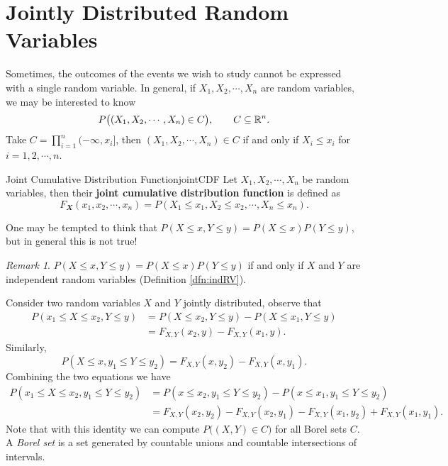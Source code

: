 \documentclass[math]{amznotes}
\theoremstyle{remark}
\newtheorem*{remark}{Remark}
\begin{document}
\section{Jointly Distributed Random Variables}
Sometimes, the outcomes of the events we wish to study cannot be expressed with a single random variable. In general, if $X_1, X_2, \cdots, X_n$ are random variables, we may be interested to know
\begin{equation*}
    P\bigl((X_1, X_2, \cdots, X_n) \in C\bigr), \qquad C \subseteq \mathbb{R}^n.
\end{equation*}
Take $C = \prod_{i = 1}^{n}(-\infty, x_i]$, then $(X_1, X_2, \cdots, X_n) \in C$ if and only if $X_i \leq x_i$ for $i = 1, 2, \cdots, n$. 
\begin{dfnbox}{Joint Cumulative Distribution Function}{jointCDF}
    Let $X_1, X_2, \cdots, X_n$ be random variables, then their {\color{red} \textbf{joint cumulative distribution function}} is defined as
    \begin{equation*}
        F_{\mathbfit{X}}(x_1, x_2, \cdots, x_n) = P(X_1 \leq x_1, X_2 \leq x_2, \cdots, X_n \leq x_n).
    \end{equation*}
\end{dfnbox}
One may be tempted to think that $P(X \leq x, Y \leq y) = P(X \leq x)P(Y \leq y)$, but in general this is not true!
\begin{notebox}
    \begin{remark}
        $P(X \leq x, Y \leq y) = P(X \leq x)P(Y \leq y)$ if and only if $X$ and $Y$ are independent random variables (Definition \ref{dfn:indRV}).
    \end{remark}
\end{notebox}
Consider two random variables $X$ and $Y$ jointly distributed, observe that
\begin{align*}
    P(x_1 \leq X \leq x_2, Y \leq y) & = P(X \leq x_2, Y \leq y) - P(X \leq x_1, Y \leq y) \\
    & = F_{X, Y}(x_2, y) - F_{X, Y}(x_1, y).
\end{align*}
Similarly,
\begin{equation*}
    P(X \leq x, y_1 \leq Y \leq y_2) = F_{X, Y}(x, y_2) - F_{X, Y}(x, y_1).
\end{equation*}
Combining the two equations we have
\begin{align*}
    P(x_1 \leq X \leq x_2, y_1 \leq Y \leq y_2) & = P(x \leq x_2, y_1 \leq Y \leq y_2) - P(x \leq x_1, y_1 \leq Y \leq y_2) \\
    & = F_{X, Y}(x_2, y_2) - F_{X, Y}(x_2, y_1) - F_{X, Y}(x_1, y_2) + F_{X, Y}(x_1, y_1).
\end{align*}
Note that with this identity we can compute $P\bigl((X, Y) \in C\bigr)$ for all Borel sets $C$. A \textit{Borel set} is a set generated by countable unions and countable intersections of intervals.
\end{document}
